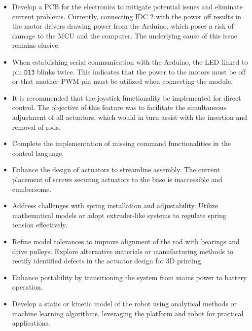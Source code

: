 \begin{itemize}
    \item Develop a PCB for the electronics to mitigate potential issues and eliminate current problems. Currently, connecting IDC 2 with the power off results in the motor drivers drawing power from the Arduino, which poses a risk of damage to the MCU and the computer. The underlying cause of this issue remains elusive.
    
    \item When establishing serial communication with the Arduino, the LED linked to pin \texttt{D13} blinks twice. This indicates that the power to the motors must be off or that another PWM pin must be utilized when connecting the module.
    
    \item It is recommended that the joystick functionality be implemented for direct control. The objective of this feature was to facilitate the simultaneous adjustment of all actuators, which would in turn assist with the insertion and removal of rods.
    
    \item Complete the implementation of missing command functionalities in the control language.
    
    \item Enhance the design of actuators to streamline assembly. The current placement of screws securing actuators to the base is inaccessible and cumbersome.
    
    \item Address challenges with spring installation and adjustability. Utilize mathematical models or adopt extruder-like systems to regulate spring tension effectively.
    
    \item Refine model tolerances to improve alignment of the rod with bearings and drive pulleys. Explore alternative materials or manufacturing methods to rectify identified defects in the actuator design for 3D printing.
    
    \item Enhance portability by transitioning the system from mains power to battery operation.
    
    \item Develop a static or kinetic model of the robot using analytical methods or machine learning algorithms, leveraging the platform and robot for practical applications.
\end{itemize}